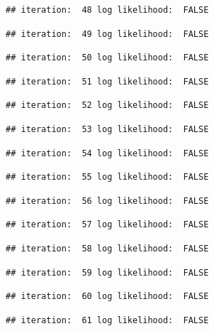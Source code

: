 \documentclass[
]{article}
\begin{document}
\begin{lstlisting}
## iteration:  48 log likelihood:  FALSE
\end{lstlisting}

\begin{lstlisting}
## iteration:  49 log likelihood:  FALSE
\end{lstlisting}

\begin{lstlisting}
## iteration:  50 log likelihood:  FALSE
\end{lstlisting}

\begin{lstlisting}
## iteration:  51 log likelihood:  FALSE
\end{lstlisting}

\begin{lstlisting}
## iteration:  52 log likelihood:  FALSE
\end{lstlisting}

\begin{lstlisting}
## iteration:  53 log likelihood:  FALSE
\end{lstlisting}

\begin{lstlisting}
## iteration:  54 log likelihood:  FALSE
\end{lstlisting}

\begin{lstlisting}
## iteration:  55 log likelihood:  FALSE
\end{lstlisting}

\begin{lstlisting}
## iteration:  56 log likelihood:  FALSE
\end{lstlisting}

\begin{lstlisting}
## iteration:  57 log likelihood:  FALSE
\end{lstlisting}

\begin{lstlisting}
## iteration:  58 log likelihood:  FALSE
\end{lstlisting}

\begin{lstlisting}
## iteration:  59 log likelihood:  FALSE
\end{lstlisting}

\begin{lstlisting}
## iteration:  60 log likelihood:  FALSE
\end{lstlisting}

\begin{lstlisting}
## iteration:  61 log likelihood:  FALSE
\end{lstlisting}
\end{document}
